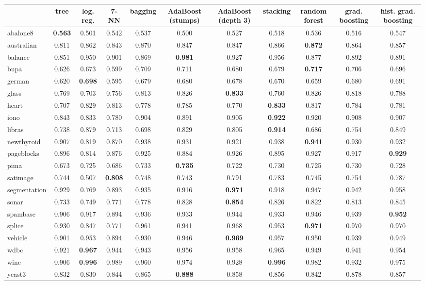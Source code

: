 \begin{tabular}{lcccccccccc}
\toprule
 & tree & log. reg. & 7-NN & bagging & AdaBoost (stumps) & AdaBoost (depth 3) & stacking & random forest & grad. boosting & hist. grad. boosting \\
\midrule
abalone8 & \textbf{0.563} & 0.501 & 0.542 & 0.537 & 0.500 & 0.527 & 0.518 & 0.536 & 0.516 & 0.547 \\
australian & 0.811 & 0.862 & 0.843 & 0.870 & 0.847 & 0.847 & 0.866 & \textbf{0.872} & 0.864 & 0.857 \\
balance & 0.851 & 0.950 & 0.901 & 0.869 & \textbf{0.981} & 0.927 & 0.956 & 0.877 & 0.892 & 0.891 \\
bupa & 0.626 & 0.673 & 0.599 & 0.709 & 0.711 & 0.680 & 0.679 & \textbf{0.717} & 0.706 & 0.696 \\
german & 0.620 & \textbf{0.698} & 0.595 & 0.679 & 0.680 & 0.678 & 0.670 & 0.659 & 0.680 & 0.691 \\
glass & 0.769 & 0.703 & 0.756 & 0.813 & 0.826 & \textbf{0.833} & 0.760 & 0.826 & 0.818 & 0.788 \\
heart & 0.707 & 0.829 & 0.813 & 0.778 & 0.785 & 0.770 & \textbf{0.833} & 0.817 & 0.784 & 0.781 \\
iono & 0.843 & 0.833 & 0.780 & 0.904 & 0.891 & 0.905 & \textbf{0.922} & 0.920 & 0.908 & 0.907 \\
libras & 0.738 & 0.879 & 0.713 & 0.698 & 0.829 & 0.805 & \textbf{0.914} & 0.686 & 0.754 & 0.849 \\
newthyroid & 0.907 & 0.819 & 0.870 & 0.938 & 0.931 & 0.921 & 0.938 & \textbf{0.941} & 0.930 & 0.932 \\
pageblocks & 0.896 & 0.814 & 0.876 & 0.925 & 0.884 & 0.926 & 0.895 & 0.927 & 0.917 & \textbf{0.929} \\
pima & 0.673 & 0.725 & 0.686 & 0.733 & \textbf{0.735} & 0.722 & 0.730 & 0.725 & 0.730 & 0.728 \\
satimage & 0.744 & 0.507 & \textbf{0.808} & 0.748 & 0.743 & 0.791 & 0.783 & 0.745 & 0.754 & 0.787 \\
segmentation & 0.929 & 0.769 & 0.893 & 0.935 & 0.916 & \textbf{0.971} & 0.918 & 0.947 & 0.942 & 0.958 \\
sonar & 0.733 & 0.749 & 0.771 & 0.778 & 0.828 & \textbf{0.854} & 0.826 & 0.822 & 0.813 & 0.845 \\
spambase & 0.906 & 0.917 & 0.894 & 0.936 & 0.933 & 0.944 & 0.933 & 0.946 & 0.939 & \textbf{0.952} \\
splice & 0.930 & 0.847 & 0.771 & 0.961 & 0.941 & 0.968 & 0.953 & \textbf{0.971} & 0.970 & 0.970 \\
vehicle & 0.901 & 0.953 & 0.894 & 0.930 & 0.946 & \textbf{0.969} & 0.957 & 0.950 & 0.939 & 0.949 \\
wdbc & 0.921 & \textbf{0.967} & 0.944 & 0.943 & 0.956 & 0.958 & 0.965 & 0.949 & 0.941 & 0.954 \\
wine & 0.906 & \textbf{0.996} & 0.989 & 0.960 & 0.974 & 0.928 & \textbf{0.996} & 0.982 & 0.932 & 0.975 \\
yeast3 & 0.832 & 0.830 & 0.844 & 0.865 & \textbf{0.888} & 0.858 & 0.856 & 0.842 & 0.878 & 0.857 \\
\bottomrule
\end{tabular}
